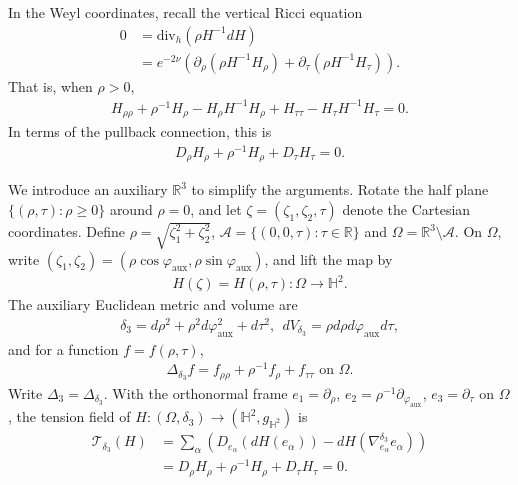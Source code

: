 \documentclass[letterpaper]{amsart}
\theoremstyle{definition}
\theoremstyle{remark}
\begin{document}
In the Weyl coordinates, recall the vertical Ricci equation
\begin{align*}
	0&=\mathrm{div}_{h}\left( \rho H ^{-1} d H \right)\\
	 &=e ^{- 2 \nu }\left( \partial _{\rho }\left( \rho H^{-1} H_{\rho } \right) + \partial _{\tau }\left( \rho H ^{-1} H_{\tau } \right)   \right) .
\end{align*} 
That is, when $\rho >0$,
\begin{align*}
	 H_{\rho \rho } + \rho ^{-1} H_{\rho }- H_{\rho } H ^{-1} H_{\rho } +  H_{\tau \tau } - H_{\tau }H ^{-1} H_{\tau }=0.
\end{align*} 
In terms of the pullback connection, this is
\begin{align*}
	D_{\rho } H_{\rho } + \rho ^{-1} H_{\rho } + D_{\tau } H_{\tau } =0.
\end{align*} 

We introduce an auxiliary $\mathbb{R}^3$ to simplify the arguments. Rotate the half plane $\{(\rho , \tau ): \rho \geq 0\} $ around $\rho =0$, and let $\zeta = (\zeta _1, \zeta _2, \tau )$ denote the Cartesian coordinates. Define $\rho = \sqrt{\zeta _1 ^2+ \zeta _2 ^2 } $, $\mathcal{A}= \{(0,0,\tau ): \tau \in \mathbb{R}\} $ and $\Omega = \mathbb{R}^3 \setminus \mathcal{A}$. On $\Omega $, write $(\zeta _1, \zeta _2) = (\rho \cos\varphi _{\mathrm{aux}}, \rho \sin \varphi _{\mathrm{aux}})$, and lift the map by
\begin{align*}
	H(\zeta ) = H(\rho , \tau ) : \Omega \to \mathbb{H}^2.
\end{align*} 
The auxiliary Euclidean metric and volume are
\begin{align*}
	\delta _{3} = d \rho ^2 + \rho ^2 d \varphi ^2_{\mathrm{aux}} + d \tau ^2, \ \ dV_{\delta _3} = \rho d \rho d \varphi _{\mathrm{aux}} d \tau ,
\end{align*} 
and for a function $f = f(\rho , \tau )$, 
\begin{align*}
	\Delta _{\delta _3} f =  f_{\rho \rho } + \rho ^{-1} f_{\rho } + f_{\tau \tau } \text{ on } \Omega .
\end{align*} 
Write $\Delta_3=\Delta_{\delta_3}$. With the orthonormal frame
$e_1=\partial_\rho$, $e_2=\rho^{-1}\partial_{\varphi_{\mathrm{aux}}}$,
$e_3=\partial_\tau$ on $\Omega$, the tension field of
$H:(\Omega,\delta_3)\to(\mathbb H^2,g_{\mathbb H^2})$ is
\begin{align*}
	\mathcal{T}_{\delta _3}(H) &= \sum_{\alpha }^{} \left( D_{e_{\alpha }} (dH(e_{\alpha }) ) - d H (\nabla ^{\delta _3}_{e_{\alpha }} e_{\alpha }) \right)  \\
				   &= D_{\rho } H_{\rho } + \rho ^{-1} H_{\rho } + D_{\tau } H_{\tau } =0.
\end{align*} 
\end{document}
